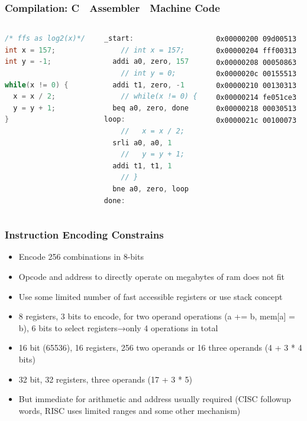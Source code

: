 \documentclass{beamer}
\begin{document}
\begin{frame}[fragile,shrink=10]
\frametitle{Compilation: C  Assembler  Machine Code}

\begin{columns}
\begin{column}{0.3\textwidth}
\begin{lstlisting}[language={C},columns=flexible]
/* ffs as log2(x)*/
int x = 157;
int y = -1;
 
while(x != 0) {
  x = x / 2;
  y = y + 1;
}
\end{lstlisting}
\end{column}

\begin{column}{0.4\textwidth}  
\begin{lstlisting}[language={C},columns=flexible]
_start:
    // int x = 157;
  addi a0, zero, 157  
    // int y = 0;
  addi t1, zero, -1   
    // while(x != 0) {
  beq a0, zero, done  
loop:
    //   x = x / 2;
  srli a0, a0, 1 
    //   y = y + 1;
  addi t1, t1, 1      
    // }
  bne a0, zero, loop  
done:
\end{lstlisting}
\end{column}

\begin{column}{0.3\textwidth}  
\texttt{0x00000200  09d00513\\
0x00000204  fff00313\\
0x00000208  00050863\\
0x0000020c  00155513\\
0x00000210  00130313\\
0x00000214  fe051ce3\\
0x00000218  00030513\\
0x0000021c  00100073}
\end{column}

\end{columns}

\end{frame}


\begin{frame}
\frametitle{Instruction Encoding Constrains}
\begin{itemize}
\item Encode 256 combinations in 8-bits
\item Opcode and address to directly operate on megabytes of ram does not fit
\item Use some limited number of fast accessible registers or use stack concept
\item 8 registers, 3 bits to encode, for two operand operations (a += b, mem[a] = b), 6 bits to select registers→only 4 operations in total
\item 16 bit (65536), 16 registers, 256 two operands or 16 three operands (4 + 3 * 4 bits)
\item 32 bit, 32 registers, three operands (17 + 3 * 5)
\item But immediate for arithmetic and address usually required (CISC followup words, RISC uses limited ranges and some other mechanism) 
\end{itemize}
\end{frame}
\end{document}
